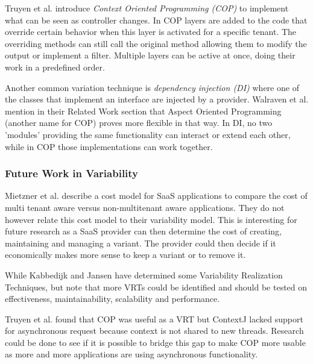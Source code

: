 Truyen et al. \cite{truyen2012context} introduce \textit{Context Oriented Programming (COP)} to implement what can be seen as controller changes. 
In COP layers are added to the code that override certain behavior when this layer is activated for a specific tenant. 
The overriding methods can still call the original method allowing them to modify the output or implement a filter. 
Multiple layers can be active at once, doing their work in a predefined order. 

Another common variation technique is \textit{dependency injection (DI)} \cite{walraven2011middleware} where one of the classes that implement an interface are injected by a provider. 
Walraven et al. mention in their Related Work section that Aspect Oriented Programming (another name for COP) proves more flexible in that way. 
In DI, no two 'modules' providing the same functionality can interact or extend each other, while in COP those implementations can work together. 

\subsubsection{Future Work in Variability}

Mietzner et al. \cite{mietzner2009variability} describe a cost model for SaaS applications to compare the cost of multi tenant aware versus non-multitenant aware applications. They do not however relate this cost model to their variability model. This is interesting for future research as a SaaS provider can then determine the cost of creating, maintaining and managing a variant. The provider could then decide if it economically makes more sense to keep a variant or to remove it.


While Kabbedijk and Jansen \cite{kabbedijk2011variability} have determined some Variability Realization Techniques, but note that more VRTs could be identified and should be tested on effectiveness, maintainability, scalability and performance.


Truyen et al. \cite{truyen2012context} found that COP was useful as a VRT but ContextJ lacked support for asynchronous request because context is not shared to new threads. Research could be done to see if it is possible to bridge this gap to make COP more usable as more and more applications are using asynchronous functionality.

